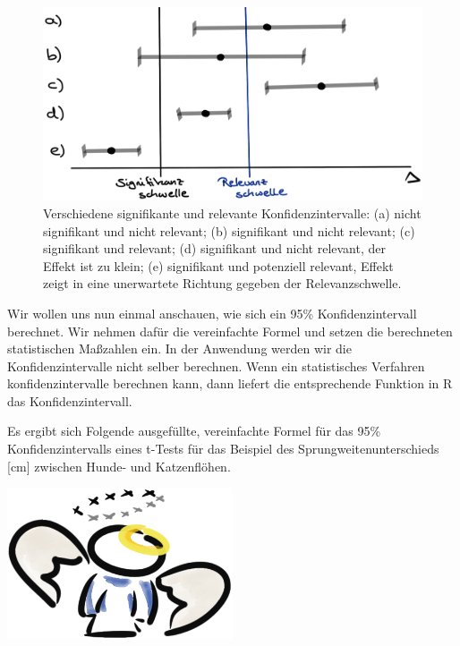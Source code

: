 \documentclass[
  letterpaper,
]{scrbook}
\begin{document}
\begin{figure}

{\centering \includegraphics{./images/ci-02.png}

}

\caption{\label{fig-relevanz}Verschiedene signifikante und relevante
Konfidenzintervalle: (a) nicht signifikant und nicht relevant; (b)
signifikant und nicht relevant; (c) signifikant und relevant; (d)
signifikant und nicht relevant, der Effekt ist zu klein; (e) signifikant
und potenziell relevant, Effekt zeigt in eine unerwartete Richtung
gegeben der Relevanzschwelle.}

\end{figure}

Wir wollen uns nun einmal anschauen, wie sich ein 95\%
Konfidenzintervall berechnet. Wir nehmen dafür die vereinfachte Formel
und setzen die berechneten statistischen Maßzahlen ein. In der Anwendung
werden wir die Konfidenzintervalle nicht selber berechnen. Wenn ein
statistisches Verfahren konfidenzintervalle berechnen kann, dann liefert
die entsprechende Funktion in R das Konfidenzintervall.

Es ergibt sich Folgende ausgefüllte, vereinfachte Formel für das 95\%
Konfidenzintervalls eines t-Tests für das Beispiel des
Sprungweitenunterschieds {[}cm{]} zwischen Hunde- und Katzenflöhen.

\begin{marginfigure}

{\centering \includegraphics[width=0.5\textwidth,height=\textheight]{./images/angel_01.png}

}

\end{marginfigure}
\end{document}
